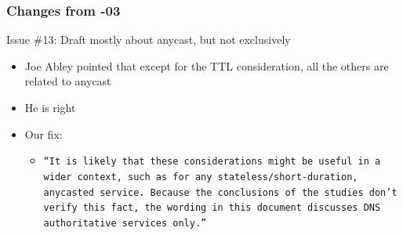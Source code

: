 \documentclass[11pt,show 
notes,notheorems,noamsthm,blank]{beamer} %
\begin{document}
\begin{frame}
\frametitle{Changes from -03}
\begin{block}{ Issue \#13: Draft mostly about anycast, but not exclusively}
\begin{itemize}
 \item Joe Abley pointed that except for the TTL consideration, all the others are related to anycast
 \item He is right
 \item Our fix:
 \begin{itemize}
 
 \item
 
      \texttt{``It is likely that these considerations might be useful in a wider context,
         such as for any stateless/short-duration, anycasted service. 
         Because the conclusions of the studies don't verify this fact, 
         the wording in this document discusses DNS authoritative services only.''}

 \end{itemize}
\end{itemize} 

 
\end{block}



\end{frame}
\end{document}

